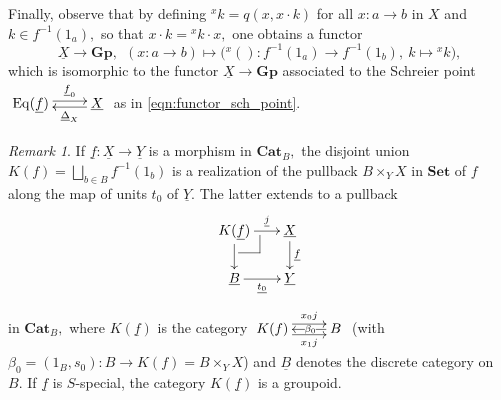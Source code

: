 \documentclass[11pt]{amsart}
\makeatletter
\theoremstyle{plain}
\theoremstyle{definition}
\theoremstyle{remark}
\newtheorem{remark}[subsubsection]{Remark}
\newcommand{\pullback}[4]{{#1 \leftindex_{#2}{\times}_{#3} #4}}
\newcommand{\un}{\underline}
\def\pullback{%
 \ar@{-}[]+R+<4pt,-3pt>;[]+RD+<4pt,-6pt>%
 \ar@{-}[]+D+<3pt,-6pt>;[]+RD+<4pt,-6pt>}
\def\pullback{%
 \ar@{-}[]+R+<4pt,-3pt>;[]+RD+<4pt,-6pt>%
 \ar@{-}[]+D+<3pt,-6pt>;[]+RD+<4pt,-6pt>}
\makeatother
\begin{document}
Finally, observe that by defining ${^xk}=q(x,x\cdot k)$ for all $x:a\rightarrow b$ in $X$ and $k\in f^{-1}(1_a),$ so that $x\cdot k={^xk}\cdot x,$ one obtains a functor
\begin{equation}
\label{eqn:functor_s-special}
\underline{X} \rightarrow \mathbf{Gp}, \ \  (x\colon a\rightarrow b) \mapsto \big({^x()}\colon f^{-1}(1_a)\rightarrow f^{-1}(1_b), \ k\mapsto {^xk}\big),
\end{equation}
which is isomorphic to the functor $\underline{X}\rightarrow \mathbf{Gp}$ associated to the Schreier point $\xymatrix{{\mathrm{Eq}(\underline{f})} \ar@<.5ex>[r]^-{\underline{f}_0} &{\underline{X}} \ar@<.5ex>[l]^-{\underline{\Delta}_X} }$ as in \eqref{eqn:functor_sch_point}.
\begin{remark}
\label{rmk:actions_and_schreier_points_Cat_B}
If $\un{f}\colon\un{X}\rightarrow\un{Y}$ is a morphism in $\mathbf{Cat}_B,$ the disjoint union $K(f)=\bigsqcup_{b\in B}f^{-1}(1_b)$ is a realization of the pullback $B\times_YX$ in $\mathbf{Set}$ of $f$ along the map of units $t_0$ of $\un{Y}.$ The latter extends to a pullback
\begin{equation}
\begin{aligned}
\label{eqn:K_f}
\xymatrixrowsep{1.5pc}
\xymatrixcolsep{1.5pc}
\xymatrix{
{K(\un{f})}\ar[d] \pullback \ar[r]^-{\un{j}} &{\un{X}} \ar[d]^-{\un{f}} \\
{\un{B}} \ar[r]_-{\un{t_0}} &{\un{Y}}
}
\end{aligned}
\end{equation}
in $\mathbf{Cat}_B,$ where $K(\un{f})$ is the category $\xymatrix{{K(f)} \ar@<.9ex>[r]^-{x_0j} \ar@<-.9ex>[r]_-{x_1j} &{B} \ar[l]|(.40){\beta_0}}$ (with $\beta_0=(1_B,s_0):B\rightarrow K(f)=B\times_YX$) and $\un{B}$ denotes the discrete category on $B.$ If $\un{f}$ is $S$-special, the category $K(\un{f})$ is a groupoid.


\end{remark}
\end{document}
